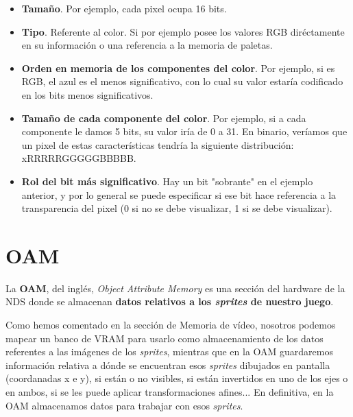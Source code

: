 \vspace{0.5cm}

\begin{itemize}
 \item \textbf{Tamaño}. Por ejemplo, cada pixel ocupa 16 bits.
  \item \textbf{Tipo}. Referente al color. Si por ejemplo posee los valores RGB diréctamente en su información o una referencia a la memoria de paletas.
   \item \textbf{Orden en memoria de los componentes del color}. Por ejemplo, si es RGB, el azul es el menos significativo, con lo cual su valor estaría codificado en los bits menos significativos.
    \item \textbf{Tamaño de cada componente del color}. Por ejemplo, si a cada componente le damos 5 bits, su valor iría de 0 a 31. En binario, veríamos que un pixel de estas características tendría la siguiente distribución: xRRRRRGGGGGBBBBB.
    \item \textbf{Rol del bit más significativo}. Hay un bit "sobrante" en el ejemplo anterior, y por lo general se puede especificar si ese bit hace referencia a la transparencia del pixel (0 si no se debe visualizar, 1 si se debe visualizar).
\end{itemize}

\vspace{1cm}

\section{OAM}

La \textbf{OAM}, del inglés, \textit{Object Attribute Memory} es una sección del hardware de la NDS donde se almacenan \textbf{datos relativos a los \textit{sprites} de nuestro juego}.

\vspace{0.5cm}

Como hemos comentado en la sección de Memoria de vídeo, nosotros podemos mapear un banco de VRAM para usarlo como almacenamiento de los datos referentes a las imágenes de los \textit{sprites}, mientras que en la OAM guardaremos información relativa a dónde se encuentran esos \textit{sprites} dibujados en pantalla (coordanadas x e y), si están o no visibles, si están invertidos en uno de los ejes o en ambos, si se les puede aplicar transformaciones afines... En definitiva, en la OAM almacenamos datos para trabajar con esos \textit{sprites}.

\vspace{0.5cm}

